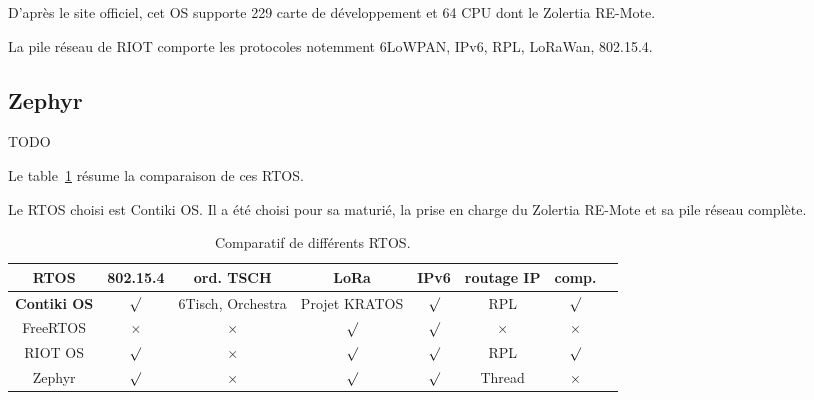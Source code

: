     D'après le site officiel, cet OS supporte 229 carte de développement et 64 CPU dont le Zolertia RE-Mote. 

    La pile réseau de RIOT comporte les protocoles notemment 6LoWPAN, IPv6, RPL, LoRaWan, 802.15.4.

\subsection*{Zephyr}
    TODO

Le table~\ref{tb:state-rtos-choice} résume la comparaison de ces RTOS.

Le RTOS choisi est Contiki OS. Il a été choisi pour sa maturié, la prise en charge du Zolertia RE-Mote et sa pile réseau complète.


\begin{table}[H]
    \begin{adjustbox}{width=\textwidth}
        \begin{tabular}{c||c|c|c|c|c|c|c}
            RTOS & 802.15.4 & ord. TSCH & LoRa & IPv6 & routage IP & comp. \\ \hline

            \textbf{Contiki OS} & $\surd$  & 6Tisch, Orchestra & Projet KRATOS & $\surd$ & RPL        & $\surd$ \\ \hline

            FreeRTOS            & $\times$ & $\times$          & $\surd$       & $\surd$ & $\times$   &    $\times$     \\ \hline

            RIOT OS             & $\surd$  & $\times$          & $\surd$       & $\surd$ & RPL        &    $\surd$     \\ \hline

            Zephyr              & $\surd$  & $\times$          & $\surd$       & $\surd$ & Thread     &    $\times$     \\
        \end{tabular}
    \end{adjustbox}
    \caption{Comparatif de différents RTOS.}
    \label{tb:state-rtos-choice}
\end{table}